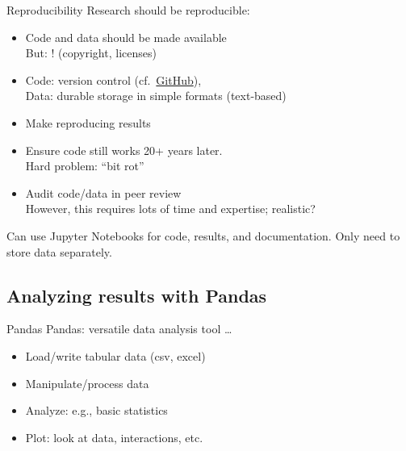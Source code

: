 \documentclass[aspectratio=169,usenames,dvipsnames]{beamer}
\begin{document}
\begin{frame}{Reproducibility}
    Research should be reproducible:

    \begin{itemize}
        \item Code and data should be made available \\
            But: ! (copyright, licenses)
        \item Code: version control (cf.\ \href{http://www.github.com}{GitHub}),\\
            Data: durable storage in simple formats (text-based)
        \item Make reproducing results 
        \item Ensure code still works 20+ years later. \\
            Hard problem: ``bit rot''
        \item Audit code/data in peer review \\
            However, this requires lots of time and expertise; realistic?
    \end{itemize}

    Can use Jupyter Notebooks for code, results, and documentation.
    Only need to store data separately.
\end{frame}


\subsection{Analyzing results with Pandas}
\frame{\tableofcontents[currentsubsection]}

\begin{frame}{Pandas}
    Pandas: versatile data analysis tool \dots

    \begin{itemize}
        \item Load/write tabular data (csv, excel)
        \item Manipulate/process data
        \item Analyze: e.g., basic statistics
        \item Plot: look at data, interactions, etc.
    \end{itemize}
\end{frame}
\end{document}
